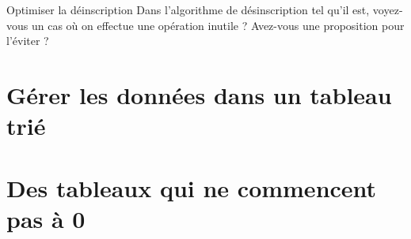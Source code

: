 			\begin{Exercice}{Optimiser la déinscription}
				Dans l'algorithme de désinscription tel qu'il est,
				voyez-vous un cas où on effectue une opération inutile ?
				Avez-vous une proposition pour l'éviter ?
			\end{Exercice}

	\section{Gérer les données dans un tableau trié} 

	\section{Des tableaux qui ne commencent pas à 0} 
